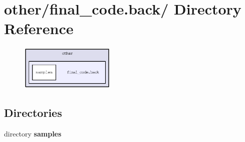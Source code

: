 \section{other/final\_\-code.back/ Directory Reference}
\label{dir_9818a00eb375797cf52bcadf4a80f352}


\begin{figure}[H]
\begin{center}
\leavevmode
\includegraphics[width=129pt]{dir_9818a00eb375797cf52bcadf4a80f352_dep}
\end{center}
\end{figure}
\subsection*{Directories}
\begin{CompactItemize}
\item 
directory \bf{samples}
\end{CompactItemize}

